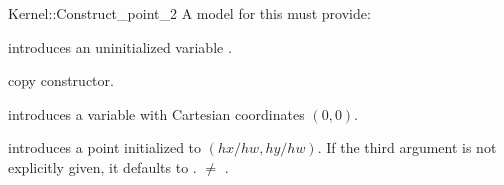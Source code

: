 \begin{ccRefFunctionObjectConcept}{Kernel::Construct_point_2}
A model for this must provide:



\ccHidden {}
             {introduces an uninitialized variable .}

\ccHidden {}
 	    {copy constructor.}

            {introduces a variable  with Cartesian coordinates
	      $(0,0)$.}

            {introduces a point  initialized to $(hx/hw,hy/hw)$.
             If the third argument is not explicitly given, it defaults
             to .
	     \ccPrecond {} $\neq$ . }


\end{ccRefFunctionObjectConcept}

